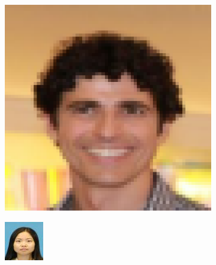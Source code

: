 \documentclass{IEEEcsmag}
\begin{document}
\begin{figure}[ht]
\begin{subfigure}{0.12\textwidth}
    \end{subfigure}
    \begin{subfigure}{0.12\textwidth}
        \includegraphics[width=\linewidth]{images/CelebA/1/original_5.png}
    \end{subfigure}
    \begin{subfigure}{0.12\textwidth}
        \includegraphics[width=\linewidth]{CUHK_Student/original_resized/f1-001-01-sz1.jpg}

\end{subfigure}
\end{figure}
\end{document}
